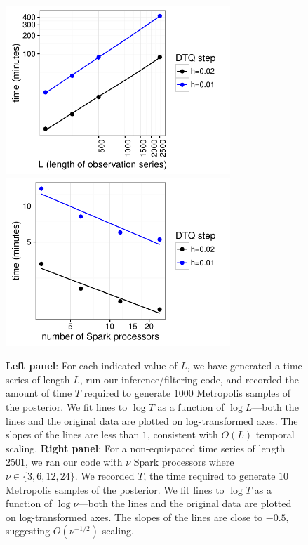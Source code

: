 \documentclass[wcp]{jmlr}
\begin{document}
\begin{figure}[th]
\begin{center}
\includegraphics[height=2.5in]{scaling}
\hspace{-0.25in} \includegraphics[height=2.5in,clip=true,trim=0 0 80 0]{scaling2}
\end{center}
\vspace{-0.25in}
\caption{\textbf{Left panel}: For each indicated value of $L$, we have generated a time
  series of length $L$, run our inference/filtering code, and recorded
  the amount of time $T$ required to generate $1000$ Metropolis samples of
  the posterior.  We fit lines to $\log T$ as a function of $\log
  L$---both the lines and the original data are plotted on
  log-transformed axes.  The slopes of the lines are less than $1$,
  consistent with $O(L)$ temporal scaling. \textbf{Right panel}: For a non-equispaced time series of length $2501$, we ran our code with $\nu$ Spark
  processors where $\nu \in \{3,6,12,24\}$.  We recorded $T$, the time required to generate
  $10$ Metropolis samples of the posterior.  We fit lines to $\log T$ as a function of $\log
  \nu$---both the lines and the original data are plotted on
  log-transformed axes.  The slopes of the lines are close to $-0.5$, suggesting $O(\nu^{-1/2})$ scaling.}
\label{fig:scaling}
\end{figure}
\end{document}
